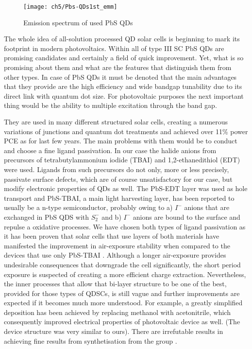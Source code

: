 \begin{figure}[H]
\center
\texttt{[image: ch5/Pbs-QDs1st\_emm]}
\caption{Emission spectrum of used PbS QDs \cite{2011}}
\end{figure}

The whole idea of all-solution processed QD solar cells is beginning to mark its footprint in modern photovoltaics. Within all of type III SC PbS QDs are promising candidates and certainly a field of quick improvement. Yet, what is so promising about them and what are the features that distinguish them from other types. 
In case of PbS QDs it must be denoted that the main advantages that they provide are the high efficiency and wide bandgap tunability due to its direct link with quantum dot size. For photovoltaic purposes the next important thing would be the ability to multiple excitation through the band gap. 

They are used in many different structured solar cells, creating a numerous variations of junctions and quantum dot treatments and achieved over 11\% power PCE as for last few years. The main problems with them would be to conduct and choose a fine ligand passivation. In our case the halide anions from precursors of tetrabutylammonium iodide (TBAI) and 1,2-ethanedithiol (EDT) were used. Ligands from such precursors do not only, more or less precisely, passivate surface defects, which are of course unsatisfactory for our case, but modify electronic properties of QDs as well. The PbS-EDT layer was used as hole transport and  PbS-TBAI, a main light harvesting layer,  has been reported to usually be a n-type semiconductor, probably owing to a) $I^{-}$  anions that are exchanged in PbS QDS with $S_2^{-}$ and b) $I^{-}$ anions are bound to the surface and repulse a oxidative processes. We have chosen both types of ligand passivation as it has been proven that solar cells that use layers of both materials have manifested the improvement in air-exposure stability when compared to the devices that use only PbS-TBAI \cite{Gao2018}. Although a longer air-exposure provides undesirable consequences that downgrade the cell significantly, the short period exposure is suspected of creating a more efficient charge extraction. Nevertheless, the inner processes that allow that bi-layer structure to be one of the best, provided for those types of QDSCs, is still vague and further improvements are expected if it becomes much more understood. For example, a greatly simplified deposition has been achieved by replacing methanol with acetonitrile, which consequently improved electrical properties of photovoltaic device as well\cite{Balazs2015}. (The device structure was very similar to ours). There are irrefutable results in achieving fine results from synthetisation from the group\cite{Wang2017} \cite{Hu2016}.


